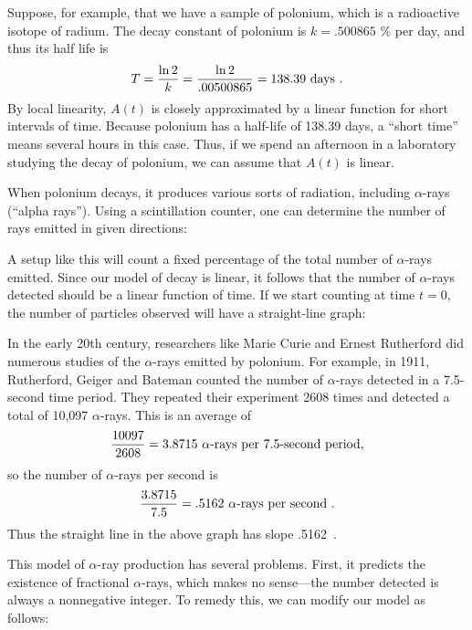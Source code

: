 {{{{Suppose, for example, that we have a sample of polonium, which is a radioactive isotope of radium.  The decay constant of polonium is $k = .500865$ \% per day, and thus its half life is 
\[
T = {{\ln2}\over k} = {{\ln2}\over.00500865} = 138.39\ \hbox{days}\ .
\]
By local linearity, $A(t)$ is closely approximated by a linear function for short intervals of time.  Because polonium has a half-life of 138.39 days, a ``short time'' means several hours in this case.  Thus, if we spend an afternoon in a laboratory studying the decay of polonium, we can assume that $A(t)$ is linear.

        When polonium decays, it produces various sorts of radiation, including $\alpha$-rays (``alpha rays'').  Using a scintillation counter, one can determine the number of rays emitted in given directions:
\vspace*{2in}

\noindent A setup like this will count a fixed percentage of the total number of $\alpha$-rays emitted.  Since our model of decay is linear, it follows that the number of $\alpha$-rays detected should be a linear function of time.  If we start counting at time $t = 0$, the number of particles observed will have a straight-line graph:\label{linear}
\vspace*{2in}


        In the early 20th century, researchers like Marie Curie and Ernest Rutherford did numerous studies of the $\alpha$-rays emitted by polonium.  For example, in 1911, Rutherford, Geiger and Bateman counted the number of $\alpha$-rays detected in a 7.5-second time period.  They repeated their experiment 2608 times and detected a total of 10,097 $\alpha$-rays.  This is an average of
\[
{10097\over2608} = 3.8715\ \hbox{$\alpha$-rays per 7.5-second period},
\]
so the number of $\alpha$-rays per second is 
\[
{3.8715\over7.5} = .5162\ \hbox{$\alpha$-rays per second\ .}
\]
Thus the straight line in the above graph has slope .5162\ .

        This model of $\alpha$-ray production has several problems. First, it predicts the existence of fractional $\alpha$-rays, which makes no sense---the number detected is always a nonnegative integer. To remedy this, we can modify our model as follows:
\vspace*{2in}


}}}}

